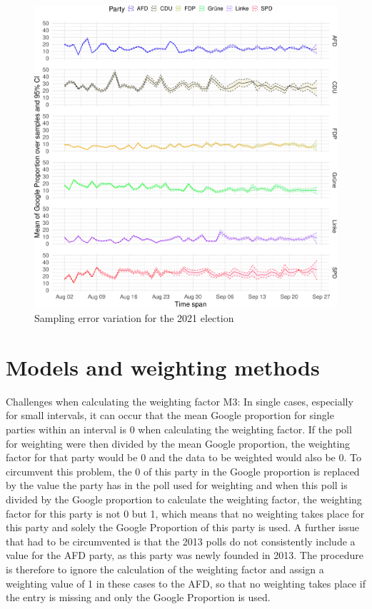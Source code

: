 \documentclass[
  letterpaper,
  DIV=11,
  numbers=noendperiod]{scrartcl}
\begin{document}
\begin{figure}[H]

\caption{\label{fig-A3}Sampling error variation for the 2021 election}

{\centering \includegraphics{figures/fig-A3-1.pdf}

}

\end{figure}

\hypertarget{models-and-weighting-methods}{%
\section{Models and weighting
methods}\label{models-and-weighting-methods}}

Challenges when calculating the weighting factor M3: In single cases,
especially for small intervals, it can occur that the mean Google
proportion for single parties within an interval is 0 when calculating
the weighting factor. If the poll for weighting were then divided by the
mean Google proportion, the weighting factor for that party would be 0
and the data to be weighted would also be 0. To circumvent this problem,
the 0 of this party in the Google proportion is replaced by the value
the party has in the poll used for weighting and when this poll is
divided by the Google proportion to calculate the weighting factor, the
weighting factor for this party is not 0 but 1, which means that no
weighting takes place for this party and solely the Google Proportion of
this party is used. A further issue that had to be circumvented is that
the 2013 polls do not consistently include a value for the AFD party, as
this party was newly founded in 2013. The procedure is therefore to
ignore the calculation of the weighting factor and assign a weighting
value of 1 in these cases to the AFD, so that no weighting takes place
if the entry is missing and only the Google Proportion is used.
\end{document}
